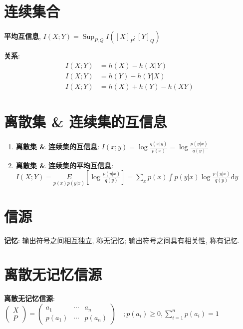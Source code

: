 \documentclass{article}
\newcommand{\env}[2]{\begin{#1}#2\end{#1}}
\newcommand{\defi}[2]{\textbf{#1}, #2}
\newcommand{\d}{\mathrm d}
\begin{document}
            \section{连续集合}
                \defi{平均互信息}{$I(X ; Y)=\operatorname{Sup}_{P, Q} I\left([X]_{P} ;[Y]_{Q}\right)$}
                
                \textbf{关系}:
                    \env{align*}{
                        I(X ; Y) &= h(X)-h(X|Y) \\
                        I(X ; Y) &= h(Y)-h(Y|X) \\
                        I(X ; Y) &= h(X)+h(Y)-h(X Y)
                    }
                    
            \section{离散集 \& 连续集的互信息}
                \env{enumerate}{
                    \item \textbf{离散集 \& 连续集的互信息}: $I(x ; y)=\log \frac{q(x|y)}{p(x)}=\log \frac{p(y|x)}{q(y)}$
                    \item \textbf{离散集 \& 连续集的平均互信息}: $I(X ; Y)=\underset{p(x) p(y|x)}{E}\left[\log \frac{p(y|x)}{q(y)}\right]=\sum_{x} p(x) \int p(y|x) \log \frac{p(y|x)}{q(y)} \d y$
                }
            
            
\section{信源}

    \textbf{记忆}: 输出符号之间相互独立, 称无记忆; 输出符号之间具有相关性, 称有记忆.
    
    \section{离散无记忆信源}
        \textbf{离散无记忆信源}:  $ \left(\begin{array}{l} X \\ P \end{array}\right)
                 = \left(\begin{array}{lll}
                    a_1 & \cdots & a_{n} \\ p\left(a_1\right) & \cdots & p\left(a_{n}\right)
                \end{array}\right) \quad;
                p\left(a_{i}\right) \geqslant 0, \sum_{i=1}^{n} p\left(a_{i}\right)=1$
                
\end{document}
